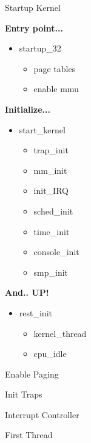 \documentclass{workshop}
\begin{document}
\begin{frame}{Startup Kernel}

\textbf{Entry point...}\\
\begin{itemize}
\item startup\_32
\begin{itemize}
\item page tables
\item enable mmu
\end{itemize}
\end{itemize}

\textbf{Initialize...}\\
\begin{itemize}
\item start\_kernel
\begin{itemize}
\item trap\_init
\item mm\_init
\item init\_IRQ
\item sched\_init
\item time\_init
\item console\_init
\item smp\_init
\end{itemize}
\end{itemize}

\textbf{And.. UP!}\\
\begin{itemize}
\item rest\_init
\begin{itemize}
\item kernel\_thread
\item cpu\_idle
\end{itemize}
\end{itemize}
\end{frame}

\begin{frame}[fragile]{Enable Paging}

\end{frame}

\begin{frame}[fragile]{Init Traps}

\end{frame}

\begin{frame}[fragile]{Interrupt Controller}

\end{frame}

\begin{frame}[fragile]{First Thread}

\end{frame}
\end{document}
